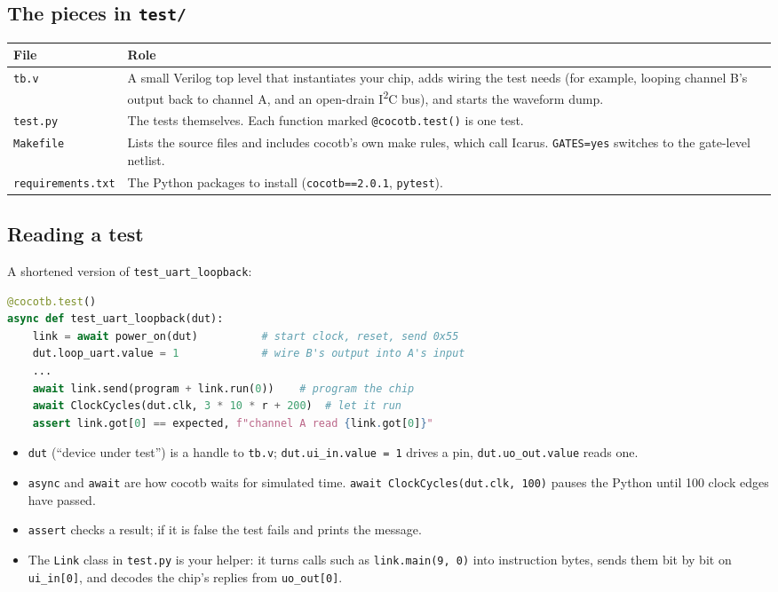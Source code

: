 \documentclass[11pt,a4paper]{article}
\newcommand{\file}[1]{\texttt{#1}}
\begin{document}
\subsection{The pieces in \file{test/}}

\begin{center}
\begin{tabularx}{\linewidth}{@{}lX@{}}
\toprule
File & Role \\
\midrule
\file{tb.v} & A small Verilog top level that instantiates your chip, adds wiring the test needs (for example, looping channel B's output back to channel A, and an open-drain I\textsuperscript{2}C bus), and starts the waveform dump. \\
\file{test.py} & The tests themselves. Each function marked \texttt{@cocotb.test()} is one test. \\
\file{Makefile} & Lists the source files and includes cocotb's own make rules, which call Icarus. \texttt{GATES=yes} switches to the gate-level netlist. \\
\file{requirements.txt} & The Python packages to install (\texttt{cocotb==2.0.1}, \texttt{pytest}). \\
\bottomrule
\end{tabularx}
\end{center}

\subsection{Reading a test}

A shortened version of \texttt{test\_uart\_loopback}:

\begin{lstlisting}[language=Python]
@cocotb.test()
async def test_uart_loopback(dut):
    link = await power_on(dut)          # start clock, reset, send 0x55
    dut.loop_uart.value = 1             # wire B's output into A's input
    ...
    await link.send(program + link.run(0))    # program the chip
    await ClockCycles(dut.clk, 3 * 10 * r + 200)  # let it run
    assert link.got[0] == expected, f"channel A read {link.got[0]}"
\end{lstlisting}

\begin{itemize}
\item \texttt{dut} (``device under test'') is a handle to \file{tb.v}; \texttt{dut.ui\_in.value = 1} drives a pin, \texttt{dut.uo\_out.value} reads one.
\item \texttt{async} and \texttt{await} are how cocotb waits for simulated time. \texttt{await ClockCycles(dut.clk, 100)} pauses the Python until 100 clock edges have passed.
\item \texttt{assert} checks a result; if it is false the test fails and prints the message.
\item The \texttt{Link} class in \file{test.py} is your helper: it turns calls such as \texttt{link.main(9, 0)} into instruction bytes, sends them bit by bit on \texttt{ui\_in[0]}, and decodes the chip's replies from \texttt{uo\_out[0]}.
\end{itemize}
\end{document}
